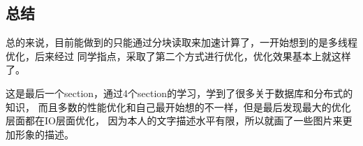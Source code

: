 \documentclass[UTF8]{ctexart}
\begin{document}
\subsection{总结}
总的来说，目前能做到的只能通过分块读取来加速计算了，一开始想到的是多线程优化，后来经过
同学指点，采取了第二个方式进行优化，优化效果基本上就这样了。

这是最后一个section，通过4个section的学习，学到了很多关于数据库和分布式的知识，
而且多数的性能优化和自己最开始想的不一样，但是最后发现最大的优化层面都在IO层面优化，
因为本人的文字描述水平有限，所以就画了一些图片来更加形象的描述。
\end{document}

